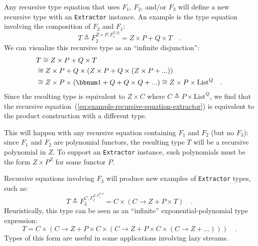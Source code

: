 Any recursive type equation that uses $F_{1}$, $F_{2}$, and/or $F_{3}$
will define a new recursive type with an \lstinline!Extractor! instance.
An example is the type equation involving the composition of $F_{2}$
and $F_{1}$:
\begin{equation}
T\triangleq F_{2}^{Z\times P,F_{1}^{T,Q}}=Z\times P+Q\times T\quad.\label{eq:example-recursive-equation-extractor}
\end{equation}
We can visualize this recursive type as an \textsf{``}infinite disjunction\textsf{''}:
\begin{align*}
 & T\cong Z\times P+Q\times T\\
 & \cong Z\times P+Q\times\left(Z\times P+Q\times\left(Z\times P+...\right)\right)\\
 & \cong Z\times P\times(\bbnum 1+Q+Q\times Q+...)\cong Z\times P\times\text{List}^{Q}\quad.
\end{align*}
Since the resulting type is equivalent to $Z\times C$ where $C\triangleq P\times\text{List}^{Q}$,
we find that the recursive equation~(\ref{eq:example-recursive-equation-extractor})
is equivalent to the product construction with a different type.

This will happen with any recursive equation containing $F_{1}$ and
$F_{2}$ (but no $F_{3}$): since $F_{1}$ and $F_{2}$ are polynomial
functors, the resulting type $T$ will be a recursive polynomial in
$Z$. To support an \lstinline!Extractor! instance, such polynomials
must be the form $Z\times P^{Z}$ for some functor $P$.

Recursive equations involving $F_{3}$ will produce new examples of
\lstinline!Extractor! types, such as:
\begin{equation}
T\triangleq F_{3}^{C,F_{2}^{Z,F_{1}^{T,P}}}=C\times\left(C\rightarrow Z+P\times T\right)\quad.\label{eq:example-good-recursive-equation-extractor}
\end{equation}
Heuristically, this type can be seen as an \textsf{``}infinite\textsf{''} exponential-polynomial
type expression:
\[
T=C\times\left(C\rightarrow Z+P\times C\times\left(C\rightarrow Z+P\times C\times\left(C\rightarrow Z+...\right)\right)\right)\quad.
\]
Types of this form are useful in some applications involving lazy
streams.

